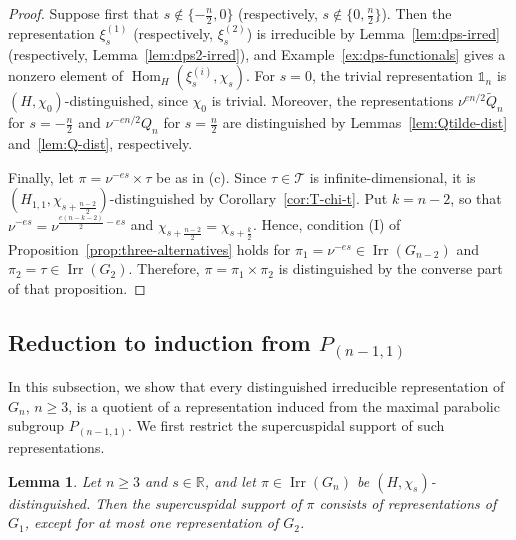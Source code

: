 \documentclass[11pt]{amsart}
\numberwithin{equation}{section}
\theoremstyle{plain}
\newtheorem{lemma}[theorem]{Lemma}
\theoremstyle{definition}
\theoremstyle{remark}
\newcommand{\R}{\mathbb{R}}
\newcommand{\one}{\mathds{1}}
\newcommand{\T}{\mathcal{T}}
\DeclareMathOperator{\Hom}{Hom}
\DeclareMathOperator{\Irr}{Irr}
\newcommand{\Qt}{\widetilde{Q}}
\newcommand{\xione}{\xi^{(1)}}
\newcommand{\xitwo}{\xi^{(2)}}
\begin{document}
\begin{proof}
	Suppose first that $s\notin\{-\frac n2,0\}$ (respectively, $s\notin\{0,\frac n2\}$). Then the representation $\xione_s$ (respectively, $\xitwo_s$) is irreducible by Lemma~\ref{lem:dps-irred} (respectively, Lemma~\ref{lem:dps2-irred}), and Example~\ref{ex:dps-functionals} gives a nonzero element of $\Hom_H(\xi^{(i)}_s,\chi_s)$. For $s=0$, the trivial representation $\one_n$ is $(H,\chi_0)$-distinguished, since $\chi_0$ is trivial. Moreover, the representations $\nu^{en/2}\Qt_n$ for $s=-\frac n2$ and $\nu^{-en/2}Q_n$ for $s=\frac n2$ are distinguished by Lemmas~\ref{lem:Qtilde-dist} and~\ref{lem:Q-dist}, respectively.
	
	Finally, let $\pi=\nu^{-es}\times\tau$ be as in (c). Since $\tau\in\T$ is infinite-dimensional, it is $(H_{1,1},\chi_{s+\frac{n-2}2})$-distinguished by Corollary~\ref{cor:T-chi-t}. Put $k=n-2$, so that $\nu^{-es}=\nu^{\frac{e(n-k-2)}2-es}$ and $\chi_{s+\frac{n-2}2}=\chi_{s+\frac k2}$. Hence, condition (I) of Proposition~\ref{prop:three-alternatives} holds for $\pi_1=\nu^{-es}\in\Irr(G_{n-2})$ and $\pi_2=\tau\in\Irr(G_2)$. Therefore, $\pi=\pi_1\times\pi_2$ is distinguished by the converse part of that proposition.
\end{proof}

\subsection{Reduction to induction from \texorpdfstring{$P_{(n-1,1)}$}{P(n-1,1)}}\label{ss:reduction}

In this subsection, we show that every distinguished irreducible representation of $G_n$, $n\ge3$, is a quotient of a representation induced from the maximal parabolic subgroup $P_{(n-1,1)}$. We first restrict the supercuspidal support of such representations.

\begin{lemma}\label{lem:sc-support}
	Let $n\ge3$ and $s\in\R$, and let $\pi\in\Irr(G_n)$ be $(H,\chi_s)$-distinguished. Then the supercuspidal support of $\pi$ consists of representations of $G_1$, except for at most one representation of $G_2$.
\end{lemma}
\end{document}
